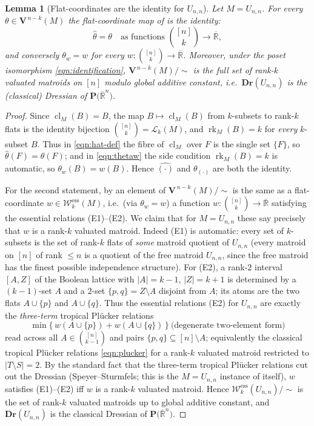 \documentclass{article}
\newtheorem{lemma}[theorem]{Lemma}
\theoremstyle{definition}
\newcommand{\Rbar}{\overline{\mathbb{R}}}
\newcommand{\rk}{\operatorname{rk}}
\newcommand{\cl}{\operatorname{cl}}
\newcommand{\Dr}{\mathbf{Dr}}
\newcommand{\bV}{\mathbf V}
\newcommand{\cLL}{\mathcal{L}}
\newcommand{\cW}{\mathcal{W}}
\newcommand{\PT}[1]{\mathbf{P}\big(\Rbar^{#1}\big)}
\begin{document}
\begin{lemma}[Flat-coordinates are the identity for $U_{n,n}$]\label{lem:Unn-flatcoord}
Let $M=U_{n,n}$. For every $\theta\in\bV^{\,n-k}(M)$ the flat-coordinate map of
 is the identity:
\[
  \widehat\theta=\theta\quad\text{as functions }\binom{[n]}{k}\to\Rbar,
\]
and conversely $\theta_w=w$ for every $w\colon\binom{[n]}{k}\to\Rbar$. Moreover, under the poset
isomorphism \eqref{eqn:identification}, $\bV^{\,n-k}(M)/\!\sim$ is the full set of rank-$k$ valuated
matroids on $[n]$ modulo global additive constant, i.e.\ $\Dr(U_{n,n})$ is the (classical) Dressian
of $\PT{n}$.
\end{lemma}

\begin{proof}
Since $\cl_M(B)=B$, the map $B\mapsto\cl_M(B)$ from $k$-subsets to rank-$k$ flats is the identity
bijection $\binom{[n]}{k}=\cLL_k(M)$, and $\rk_M(B)=k$ for \emph{every} $k$-subset $B$. Thus in
\eqref{eqn:hat-def} the fibre of $\cl_M$ over $F$ is the single set $\{F\}$, so
$\widehat\theta(F)=\theta(F)$; and in \eqref{eqn:thetaw} the side condition $\rk_M(B)=k$ is automatic,
so $\theta_w(B)=w(B)$. Hence $\widehat{(\cdot)}$ and $\theta_{(\cdot)}$ are both the identity.

For the second statement, by  an element of $\bV^{\,n-k}(M)/\!\sim$ is
the same as a flat-coordinate $w\in\cW^{\mathrm{ess}}_k(M)$, i.e.\ (via $\theta_w=w$) a function
$w\colon\binom{[n]}{k}\to\Rbar$ satisfying the essential relations (E1)--(E2). We claim that for
$M=U_{n,n}$ these say precisely that $w$ is a rank-$k$ valuated matroid. Indeed (E1) is automatic:
every set of $k$-subsets is the set of rank-$k$ flats of \emph{some} matroid quotient of $U_{n,n}$
(every matroid on $[n]$ of rank $\le n$ is a quotient of the free matroid $U_{n,n}$, since the free
matroid has the finest possible independence structure). For (E2), a rank-$2$ interval $[A,Z]$ of the
Boolean lattice with $|A|=k-1$, $|Z|=k+1$ is determined by a $(k-1)$-set $A$ and a $2$-set
$\{p,q\}=Z\setminus A$ disjoint from $A$; its atoms are the two flats $A\cup\{p\}$ and $A\cup\{q\}$.
Thus the essential relations (E2) for $U_{n,n}$ are exactly the \emph{three-term} tropical
Pl\"ucker relations
\[
  \min\bigl\{\,w(A\cup\{p\})+w(A\cup\{q\})\,\bigr\}\ \text{(degenerate two-element form)}
\]
read across all $A\in\binom{[n]}{k-1}$ and pairs $\{p,q\}\subseteq[n]\setminus A$; equivalently the
classical tropical Pl\"ucker relations \eqref{eqn:plucker} for a rank-$k$ valuated matroid restricted
to $|T\setminus S|=2$. By the standard fact that the three-term tropical Pl\"ucker relations cut out
the Dressian (Speyer--Sturmfels; this is the $M=U_{n,n}$ instance of 
itself), $w$ satisfies (E1)--(E2) iff $w$ is a rank-$k$ valuated matroid. Hence
$\cW^{\mathrm{ess}}_k(U_{n,n})/\!\sim$ is the set of rank-$k$ valuated matroids up to global additive
constant, and $\Dr(U_{n,n})$ is the classical Dressian of $\PT{n}$.
\end{proof}
\end{document}
